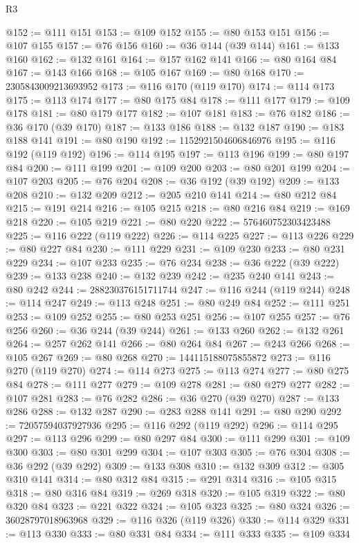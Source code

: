 \begin{lexlean}{R3}
\begin{coremodule}
@152 := @111 @151
@153 := @109 @152
@155 := @80 @153 @151
@156 := @107 @155
@157 := @76 @156
@160 := @36 @144 (@39 @144)
@161 := @133 @160
@162 := @132 @161
@164 := @157 @162 @141
@166 := @80 @164 @84
@167 := @143 @166
@168 := @105 @167
@169 := @80 @168
@170 := 2305843009213693952
@173 := @116 @170 (@119 @170)
@174 := @114 @173
@175 := @113 @174
@177 := @80 @175 @84
@178 := @111 @177
@179 := @109 @178
@181 := @80 @179 @177
@182 := @107 @181
@183 := @76 @182
@186 := @36 @170 (@39 @170)
@187 := @133 @186
@188 := @132 @187
@190 := @183 @188 @141
@191 := @80 @190
@192 := 1152921504606846976
@195 := @116 @192 (@119 @192)
@196 := @114 @195
@197 := @113 @196
@199 := @80 @197 @84
@200 := @111 @199
@201 := @109 @200
@203 := @80 @201 @199
@204 := @107 @203
@205 := @76 @204
@208 := @36 @192 (@39 @192)
@209 := @133 @208
@210 := @132 @209
@212 := @205 @210 @141
@214 := @80 @212 @84
@215 := @191 @214
@216 := @105 @215
@218 := @80 @216 @84
@219 := @169 @218
@220 := @105 @219
@221 := @80 @220
@222 := 576460752303423488
@225 := @116 @222 (@119 @222)
@226 := @114 @225
@227 := @113 @226
@229 := @80 @227 @84
@230 := @111 @229
@231 := @109 @230
@233 := @80 @231 @229
@234 := @107 @233
@235 := @76 @234
@238 := @36 @222 (@39 @222)
@239 := @133 @238
@240 := @132 @239
@242 := @235 @240 @141
@243 := @80 @242
@244 := 288230376151711744
@247 := @116 @244 (@119 @244)
@248 := @114 @247
@249 := @113 @248
@251 := @80 @249 @84
@252 := @111 @251
@253 := @109 @252
@255 := @80 @253 @251
@256 := @107 @255
@257 := @76 @256
@260 := @36 @244 (@39 @244)
@261 := @133 @260
@262 := @132 @261
@264 := @257 @262 @141
@266 := @80 @264 @84
@267 := @243 @266
@268 := @105 @267
@269 := @80 @268
@270 := 144115188075855872
@273 := @116 @270 (@119 @270)
@274 := @114 @273
@275 := @113 @274
@277 := @80 @275 @84
@278 := @111 @277
@279 := @109 @278
@281 := @80 @279 @277
@282 := @107 @281
@283 := @76 @282
@286 := @36 @270 (@39 @270)
@287 := @133 @286
@288 := @132 @287
@290 := @283 @288 @141
@291 := @80 @290
@292 := 72057594037927936
@295 := @116 @292 (@119 @292)
@296 := @114 @295
@297 := @113 @296
@299 := @80 @297 @84
@300 := @111 @299
@301 := @109 @300
@303 := @80 @301 @299
@304 := @107 @303
@305 := @76 @304
@308 := @36 @292 (@39 @292)
@309 := @133 @308
@310 := @132 @309
@312 := @305 @310 @141
@314 := @80 @312 @84
@315 := @291 @314
@316 := @105 @315
@318 := @80 @316 @84
@319 := @269 @318
@320 := @105 @319
@322 := @80 @320 @84
@323 := @221 @322
@324 := @105 @323
@325 := @80 @324
@326 := 36028797018963968
@329 := @116 @326 (@119 @326)
@330 := @114 @329
@331 := @113 @330
@333 := @80 @331 @84
@334 := @111 @333
@335 := @109 @334

\end{coremodule}
\end{lexlean}
